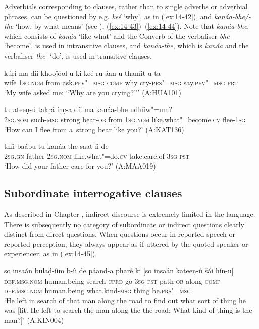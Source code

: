 Adverbials corresponding to clauses, rather than to single adverbs or adverbial phrases, can be questioned by e.g. \textit{keé} `why', as in (\ref{ex:14-42}), and \textit{kanáa-bhe/-the} `how, by what means' (see ), (\ref{ex:14-43})--(\ref{ex:14-44}). Note that \textit{kanáa-bhe}, which consists of \textit{kanáa} `like what' and the Converb of the verbaliser \textit{bhe-} `become', is used in intransitive clauses, and \textit{kanáa-the}, which is \textit{kanáa} and the verbaliser \textit{the-} `do', is used in transitive clauses.

\begin{exe}
\ex
\label{ex:14-42}
\gll kúṛi ma díi khooǰóol-u ki keé  ru-áan-u thaníit-u ta \\
wife \textsc{1sg.nom} from ask.\textsc{pfv"=msg} \textsc{comp} why  cry-\textsc{prs"=msg} say.\textsc{pfv"=msg} \textsc{prt} \\
\glt `My wife asked me: ``Why are you crying?''' (A:HUA101)

\ex
\label{ex:14-43}
\gll tu ateeṇ-ú takṛá íṇc̣-a díi ma  kanáa-bhe uḍhíiw"=um? \\
\textsc{2sg.nom} such-\textsc{msg} strong bear-\textsc{ob} from \textsc{1sg.nom}  like.what"=become.\textsc{cv} flee-\textsc{1sg} \\
\glt `How can I flee from a~strong bear like you?' (A:KAT136)

\ex
\label{ex:14-44}
\gll thíi baábu tu kanáa-the saat-íi de \\
\textsc{2sg.gn} father \textsc{2sg.nom} like.what"=do.\textsc{cv} take.care.of-\textsc{3sg} \textsc{pst} \\
\glt `How did your father care for you?' (A:MAA019)
\end{exe}

\subsection{Subordinate interrogative clauses}
\label{subsec:14-2-3}


As described in Chapter , indirect discourse is extremely limited in the language. There is subsequently no category of subordinate or indirect questions clearly distinct from direct questions. When questions occur in reported speech or reported perception, they always appear as if uttered by the quoted speaker or experiencer, as in (\ref{ex:14-45}).

\begin{exe}
\ex
\label{ex:14-45}
\gll so insaán bulaḍ-íim b-íi de  páand-a pharé ki [so insaán  kateeṇ-ú šái hín-u] \\
\textsc{def.msg.nom} human.being search-\textsc{cprd} go-\textsc{3sg} \textsc{pst} path-\textsc{ob} along \textsc{comp} \textsc{def.msg.nom} human.being what.kind-\textsc{msg} thing be.\textsc{prs"=msg } \\
\glt `He left in search of that man along the road to find out what sort of thing he was [lit. He left to search the man along the the road: What kind of thing is the man?]' (A:KIN004)
\end{exe}

